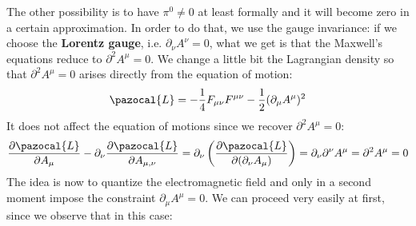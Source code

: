 \documentclass[../main.tex]{subfiles}
\begin{document}
The other possibility is to have $\pi^0\neq0$ at least formally and it will become zero in a certain approximation. In order to do that, we use the gauge invariance: if we choose the \textbf{Lorentz gauge}, i.e. $\partial_\nu A^\nu=0$, what we get is that the Maxwell's equations reduce to $\partial^2 A^\mu=0$. We change a little bit the Lagrangian density so that $\partial^2 A^\mu=0$ arises directly from the equation of motion:
\[
\pazocal{L}=-\frac{1}{4}F_{\mu\nu}F^{\mu\nu}-\frac{1}{2}(\partial_\mu A^\mu)^2
\]
It does not affect the equation of motions since we recover $\partial^2 A^\mu=0$:
\[
\frac{\partial\pazocal{L}}{\partial A_\mu}-\partial_\nu\frac{\partial\pazocal{L}}{\partial A_{\mu,\nu}}=\partial_\nu\left(\frac{\partial\pazocal{L}}{\partial(\partial_\nu A_\mu)}\right)=\partial_\nu\partial^\nu A^\mu=\partial^2 A^\mu=0
\]
The idea is now to quantize the electromagnetic field and only in a second moment impose the constraint $\partial_\mu A^\mu=0$. We can proceed very easily at first, since we observe that in this case:
\end{document}
